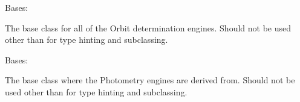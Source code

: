 \documentclass[letterpaper,11pt,english]{sphinxmanual}
\begin{document}

\begin{savenotes}\begin{fulllineitems}
\label{\detokenize{code/opihiexarata.library.engine:opihiexarata.library.engine.OrbitEngine}}
\pysigstartsignatures
{}
\pysigstopsignatures
\sphinxAtStartPar
Bases: {\hyperref[\detokenize{code/opihiexarata.library.engine:opihiexarata.library.engine.ExarataEngine}]{}}

\sphinxAtStartPar
The base class for all of the Orbit determination engines. Should not
be used other than for type hinting and subclassing.

\end{fulllineitems}\end{savenotes}


\begin{savenotes}\begin{fulllineitems}
\label{\detokenize{code/opihiexarata.library.engine:opihiexarata.library.engine.PhotometryEngine}}
\pysigstartsignatures
{}
\pysigstopsignatures
\sphinxAtStartPar
Bases: {\hyperref[\detokenize{code/opihiexarata.library.engine:opihiexarata.library.engine.ExarataEngine}]{}}

\sphinxAtStartPar
The base class where the Photometry engines are derived from. Should
not be used other than for type hinting and subclassing.

\end{fulllineitems}\end{savenotes}

\end{document}
